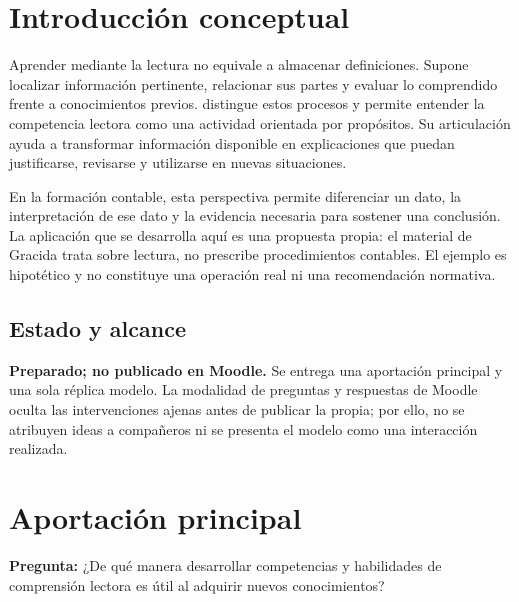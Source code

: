 


\section{Introducción conceptual}
Aprender mediante la lectura no equivale a almacenar definiciones. Supone localizar información pertinente, relacionar sus partes y evaluar lo comprendido frente a conocimientos previos. \textcite[4]{gracida2012} distingue estos procesos y permite entender la competencia lectora como una actividad orientada por propósitos. Su articulación ayuda a transformar información disponible en explicaciones que puedan justificarse, revisarse y utilizarse en nuevas situaciones.

En la formación contable, esta perspectiva permite diferenciar un dato, la interpretación de ese dato y la evidencia necesaria para sostener una conclusión. La aplicación que se desarrolla aquí es una propuesta propia: el material de Gracida trata sobre lectura, no prescribe procedimientos contables. El ejemplo es hipotético y no constituye una operación real ni una recomendación normativa.

\subsection*{Estado y alcance}
\textbf{Preparado; no publicado en Moodle.} Se entrega una aportación principal y una sola réplica modelo. La modalidad de preguntas y respuestas de Moodle oculta las intervenciones ajenas antes de publicar la propia; por ello, no se atribuyen ideas a compañeros ni se presenta el modelo como una interacción realizada.

\section{Aportación principal}
\noindent\textbf{Pregunta:} ¿De qué manera desarrollar competencias y habilidades de comprensión lectora es útil al adquirir nuevos conocimientos?

